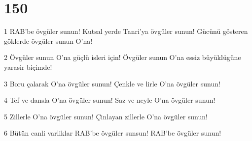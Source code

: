 \chapter{150}

\par 1 RAB'be övgüler sunun! Kutsal yerde Tanri'ya övgüler sunun! Gücünü gösteren göklerde övgüler sunun O'na!
\par 2 Övgüler sunun O'na güçlü isleri için! Övgüler sunun O'na essiz büyüklügüne yarasir biçimde!
\par 3 Boru çalarak O'na övgüler sunun! Çenkle ve lirle O'na övgüler sunun!
\par 4 Tef ve dansla O'na övgüler sunun! Saz ve neyle O'na övgüler sunun!
\par 5 Zillerle O'na övgüler sunun! Çinlayan zillerle O'na övgüler sunun!
\par 6 Bütün canli varliklar RAB'be övgüler sunsun! RAB'be övgüler sunun!


